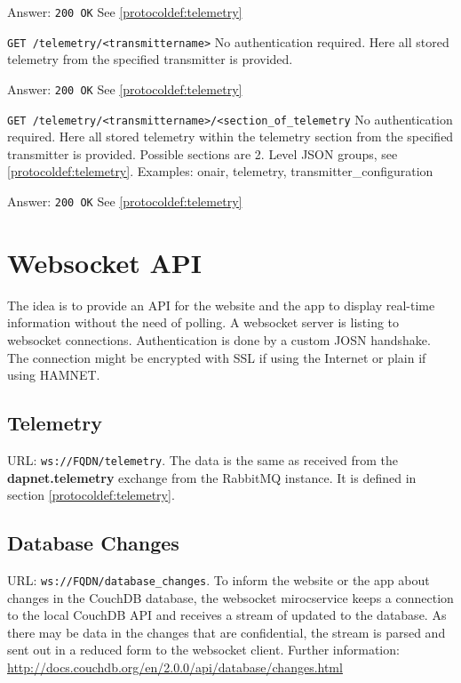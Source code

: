 Answer:
\texttt{200 OK}
See \ref{protocoldef:telemetry}

\texttt{GET /telemetry/<transmittername>}
No authentication required. Here all stored telemetry from the specified transmitter is provided.

Answer:
\texttt{200 OK}
See \ref{protocoldef:telemetry}

\texttt{GET /telemetry/<transmittername>/<section\_of\_telemetry}
No authentication required. Here all stored telemetry within the telemetry section from the specified transmitter is provided.
Possible sections are 2. Level JSON groups, see \ref{protocoldef:telemetry}.
Examples: onair, telemetry, transmitter\_configuration

Answer:
\texttt{200 OK}
See \ref{protocoldef:telemetry}



\section{Websocket API}
\label{protocoldef:websocketapi}
The idea is to provide an API for the website and the app to display real-time information without the need of polling. A websocket server is listing to websocket connections. Authentication is done by a custom JOSN handshake. The connection might be encrypted with SSL if using the Internet or plain if using HAMNET.

\subsection{Telemetry}
\label{protcoldef:websocketapi:telemetry}
URL: \texttt{ws://FQDN/telemetry}.
The data is the same as received from the \textbf{dapnet.telemetry} exchange from the RabbitMQ instance. It is defined in section \ref{protocoldef:telemetry}.

\subsection{Database Changes}
\label{protcoldef:websocketapi:databasechanges}
URL: \texttt{ws://FQDN/database\_changes}.
To inform the website or the app about changes in the CouchDB database, the websocket mirocservice keeps a connection to the local CouchDB API and receives a stream of updated to the database. As there may be data in the changes that are confidential, the stream is parsed and sent out in a reduced form to the websocket client. Further information: \url{http://docs.couchdb.org/en/2.0.0/api/database/changes.html}

